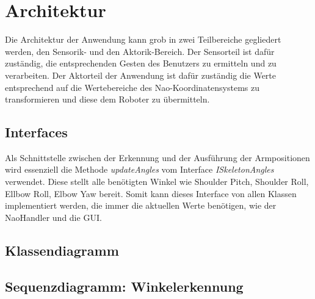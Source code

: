 \section{Architektur}
Die Architektur der Anwendung kann grob in zwei Teilbereiche gegliedert werden, den Sensorik- und den Aktorik-Bereich.
Der Sensorteil ist dafür zuständig, die entsprechenden Gesten des Benutzers zu ermitteln und zu verarbeiten. Der Aktorteil der Anwendung ist dafür zuständig die Werte entsprechend auf die Wertebereiche des Nao-Koordinatensystems zu transformieren und diese dem Roboter zu übermitteln.


\subsection{Interfaces}
Als Schnittstelle zwischen der Erkennung und der Ausführung der Armpositionen wird essenziell die Methode \textit{updateAngles} vom Interface \textit{ISkeletonAngles} verwendet. Diese stellt alle benötigten Winkel wie Shoulder Pitch, Shoulder Roll, Ellbow Roll, Elbow Yaw bereit. Somit kann dieses Interface von allen Klassen implementiert werden, die immer die aktuellen Werte benötigen, wie der NaoHandler und die GUI.

\subsection{Klassendiagramm}



\subsection{Sequenzdiagramm: Winkelerkennung}



